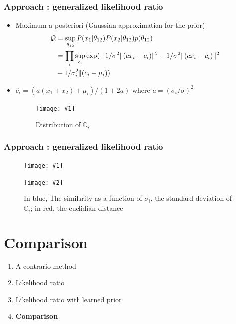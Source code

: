 \documentclass[compress]{beamer} %
\newcommand{\rand}[1]{\ensuremath{\mathbb{#1}}}
\newcommand{\insertTwoF}[4]{
  \begin{figure}[h!]
    \centering
    \begin{minipage}{#4\linewidth}
    \texttt{[image: \#1]}
    \end{minipage}
    \begin{minipage}{#4\linewidth}
    \texttt{[image: \#2]}
    \end{minipage}
      \caption{#3}
  \end{figure}  
}
\newcommand{\insertF}[3]{
  \begin{figure}[h!]
    \centering
    \begin{minipage}{#3\linewidth}
    \texttt{[image: \#1]}
    \end{minipage}  
      \caption{#2}
  \end{figure}  
}
\begin{document}
  \begin{frame}
   \frametitle{Approach : generalized likelihood ratio}
   \begin{itemize}
    \item Maximum a posteriori (Gaussian approximation for the prior) 
   \begin{equation}
   \begin{split}
       \mathcal{Q}&=\sup_{\theta_{12}} P(x_1 \arrowvert \theta_{12}) P(x_2 \arrowvert \theta_{12}) p(\theta_{12})\\
       &=\prod_i  \sup_{c_i}  \exp (- 1/\sigma^2  \lVert (cx_i -c_{i}) \rVert^2- 1/\sigma^2  \lVert (cx_i -c_{i}) \rVert^2 \\
       &- 1/\sigma_i^2  \lVert (c_{i}-\mu_i) ) 
   \end{split}
   \end{equation}
   \item $\hat c_i=(a (x_1+x_2)+\mu_i)/(1+2a)$ where $a=(\sigma_i /\sigma)^2$
   \insertF{corr}{Distribution of $\rand{C}_i$}{0.3}
   \end{itemize}

 \end{frame}
 
  \begin{frame}
  \frametitle{Approach : generalized likelihood ratio}
   \insertTwoF{curve}{corr}{ In blue, The similarity as a function of $\sigma_i$, the standard deviation of $\rand{C}_i$; in red, the euclidian distance }{0.45}
 \end{frame}
 
 
 \section{Comparison}
  \begin{frame}
 \scriptsize
 {
 \begin{enumerate}


  \item A contrario method
  \item Likelihood ratio
  \item {Likelihood ratio with learned prior}
  \item \textbf{Comparison}
  
 \end{enumerate}

  
 }
 \end{frame}
\end{document}
